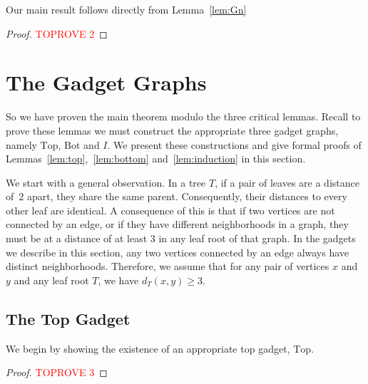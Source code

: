 \documentclass[11pt,letter]{article}
\theoremstyle{remark}
\newcommand{\T}{\text{Top}}
\newcommand{\B}{\text{Bot}}
\begin{document}
Our main result follows directly from Lemma~\ref{lem:Gn}

\begin{proof}\textcolor{red}{TOPROVE 2}\end{proof}





\section{The Gadget Graphs}\label{sec:gadgets}

So we have proven the main theorem modulo the three critical lemmas.
Recall to prove these lemmas we must construct the appropriate three gadget graphs, namely $\T$, $\B$ and $I$.
We present these constructions and give formal proofs of 
Lemmas~\ref{lem:top},~\ref{lem:bottom} and~\ref{lem:induction} in this section.

We start with a general observation. In a tree $T$, if a pair of leaves are a distance of~$2$ apart, they share the same parent. Consequently, their distances to every other leaf are identical. A consequence of this is that if two vertices are not connected by an edge, or if they have different neighborhoods in a graph, they must be at a distance of at least $3$ in any leaf root of that graph. In the gadgets we describe in this section, any two vertices connected by an edge always have distinct neighborhoods. Therefore, we assume that for any pair of vertices $x$ and $y$ and any leaf root $T$, we have $d_T(x, y) \geq 3$.


\subsection{The Top Gadget}\label{sec:top}

We begin by showing the existence of an appropriate top gadget, $\T$.

\top*
\begin{proof}\textcolor{red}{TOPROVE 3}\end{proof}
\end{document}

